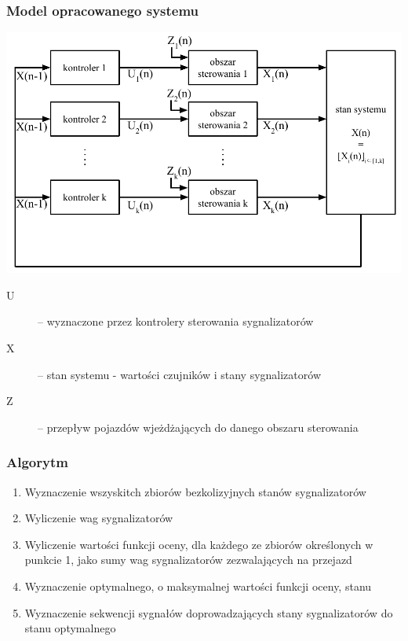 \documentclass[17pt]{beamer}
\begin{document}
\begin{frame}[shrink=5]
 \frametitle{\vspace{22px}Model opracowanego systemu}
 \includegraphics[width=1.0\textwidth]{model.pdf}
  \tiny{
  \begin{description}
   \item[U] -- wyznaczone przez kontrolery sterowania sygnalizatorów\\
   \item[X] -- stan systemu - wartości czujników i stany sygnalizatorów\\
   \item[Z] -- przepływ pojazdów wjeżdżających do danego obszaru sterowania\\
  \end{description}
   }
\end{frame}

\begin{frame}[shrink=5]
  \frametitle{\vspace{22px}Algorytm}
  \begin{enumerate}
    \item Wyznaczenie wszyskitch zbiorów bezkolizyjnych stanów sygnalizatorów
    \item Wyliczenie wag sygnalizatorów
    \item Wyliczenie wartości funkcji oceny, dla każdego ze zbiorów określonych w punkcie 1, jako sumy wag sygnalizatorów zezwalających na przejazd
    \item Wyznaczenie optymalnego, o maksymalnej wartości funkcji oceny, stanu
    \item Wyznaczenie sekwencji sygnałów doprowadzających stany sygnalizatorów do stanu optymalnego
  \end{enumerate}
\end{frame}
\end{document}
